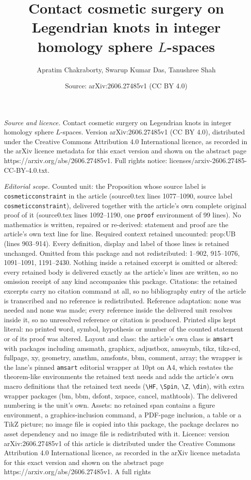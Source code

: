 \documentclass[10pt,a4paper]{amsart}
\title[Contact cosmetic surgery on Legendrian knots in integer homo]{Contact cosmetic surgery on Legendrian knots in integer homology sphere $L$-spaces}
\author{Apratim Chakraborty, Swarup Kumar Das, Tanushree Shah}
\date{Source: arXiv:2606.27485v1 (CC BY 4.0)}
\begin{document}
\maketitle

\noindent\emph{Source and licence.} Contact cosmetic surgery on Legendrian knots in integer homology sphere $L$-spaces. Version arXiv:2606.27485v1 (CC BY 4.0), distributed under the Creative Commons Attribution 4.0 International licence, as recorded in the arXiv licence metadata for this exact version and shown on the abstract page https://arxiv.org/abs/2606.27485v1. Full rights notice: licenses/arxiv-2606.27485-CC-BY-4.0.txt.\par\smallskip

\noindent\textit{Editorial scope.} Counted unit: the Proposition whose source label is \texttt{cosmeticconstraint} in the article (source0.tex lines 1077--1090, source label \texttt{cosmeticconstraint}), delivered together with the article's own complete original proof of it (source0.tex lines 1092--1190, one \texttt{proof} environment of 99 lines). No mathematics is written, repaired or re-derived: statement and proof are the article's own text line for line. Required context retained uncounted: prop:UB (lines 903--914). Every definition, display and label of those lines is retained unchanged. Omitted from this package and not redistributed: 1--902, 915--1076, 1091--1091, 1191--2430. Nothing inside a retained excerpt is omitted or altered: every retained body is delivered exactly as the article's lines are written, so no omission receipt of any kind accompanies this package. Citations: the retained excerpts carry no citation command at all, so no bibliography entry of the article is transcribed and no reference is redistributed. Reference adaptation: none was needed and none was made; every reference inside the delivered unit resolves inside it, so no unresolved reference or citation is produced. Printed slips kept literal: no printed word, symbol, hypothesis or number of the counted statement or of its proof was altered. Layout and class: the article's own class is \texttt{amsart} with packages including amsmath, graphicx, adjustbox, amssymb, tikz, tikz-cd, fullpage, xy, geometry, amsthm, amsfonts, bbm, comment, array; the wrapper is the lane's pinned \texttt{amsart} editorial wrapper at 10pt on A4, which restates the theorem-like environments the retained text needs and adds the article's own macro definitions that the retained text needs (\texttt{\textbackslash HF}, \texttt{\textbackslash Spin}, \texttt{\textbackslash Z}, \texttt{\textbackslash din}), with extra wrapper packages (bm, bbm, dsfont, xspace, cancel, mathtools). The delivered numbering is the unit's own. Assets: no retained span contains a figure environment, a graphics-inclusion command, a PDF-page inclusion, a table or a TikZ picture; no image file is copied into this package, the package declares no asset dependency and no image file is redistributed with it. Licence: version arXiv:2606.27485v1 of this article is distributed under the Creative Commons Attribution 4.0 International licence, as recorded in the arXiv licence metadata for this exact version and shown on the abstract page https://arxiv.org/abs/2606.27485v1. A full rights 
\end{document}
